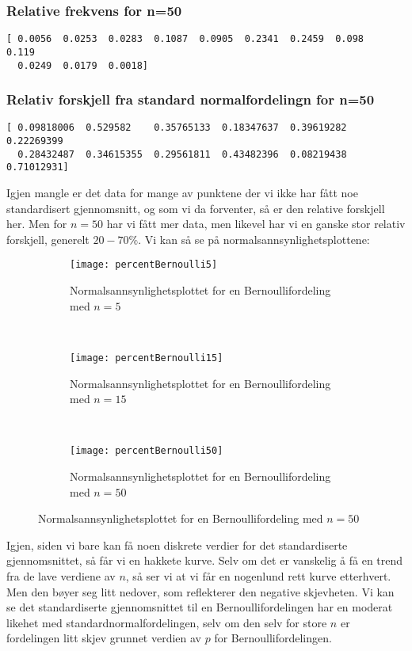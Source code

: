 \documentclass[a4paper,norsk, 10pt]{article}
\begin{document}
\subsubsection*{Relative frekvens for n=50}
\begin{Verbatim}[frame = single]
[ 0.0056  0.0253  0.0283  0.1087  0.0905  0.2341  0.2459  0.098   0.119
  0.0249  0.0179  0.0018]
\end{Verbatim}

\subsubsection*{Relativ forskjell fra standard normalfordelingn for n=50}
\begin{Verbatim}[frame = single]
[ 0.09818006  0.529582    0.35765133  0.18347637  0.39619282  0.22269399
  0.28432487  0.34615355  0.29561811  0.43482396  0.08219438  0.71012931]
\end{Verbatim}

Igjen mangle er det data for mange av punktene der vi ikke har fått noe standardisert gjennomsnitt, og som vi da forventer, så er den relative forskjell her. Men for $n = 50$ har vi fått mer data, men likevel har vi en ganske stor relativ forskjell, generelt $20-70\%$. Vi kan så se på normalsannsynlighetsplottene:


\begin{figure}[H]
\centering
	\begin{subfigure}[b]{0.4\textwidth}
        \texttt{[image: percentBernoulli5]}
        \caption{Normalsannsynlighetsplottet for en Bernoullifordeling med $n = 5$}
        \label{fig:PB15}
    \end{subfigure}
    ~
    \begin{subfigure}[b]{0.4\textwidth}
        \texttt{[image: percentBernoulli15]}
        \caption{Normalsannsynlighetsplottet for en Bernoullifordeling med $n = 15$}
        \label{fig:PB50}
    \end{subfigure}
     ~
    \begin{subfigure}[b]{0.4\textwidth}
        \texttt{[image: percentBernoulli50]}
        \caption{Normalsannsynlighetsplottet for en Bernoullifordeling med $n = 50$}
        \label{fig:PB50}
    \end{subfigure}
\end{figure} 


Igjen, siden vi bare kan få noen diskrete verdier for det standardiserte gjennomsnittet, så får vi en hakkete kurve. Selv om det er vanskelig å få en trend fra de lave verdiene av $n$, så ser vi at vi får en nogenlund rett kurve etterhvert. Men den bøyer seg litt nedover, som reflekterer den negative skjevheten. Vi kan se det standardiserte gjennomsnittet til en Bernoullifordelingen har en moderat likehet med standardnormalfordelingen, selv om den selv for store $n$ er fordelingen litt skjev grunnet verdien av $p$ for Bernoullifordelingen.
\end{document}
